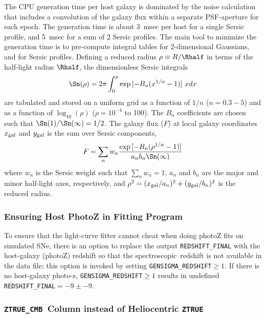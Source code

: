 \documentclass[12pt]{article}
\newcommand{\spec}{spectroscopic}
\newcommand{\ztruecmb}{{\tt ZTRUE\_CMB}}
\newcommand{\ztrue}{{\tt ZTRUE}}
\begin{document}
{The CPU generation time per host galaxy is dominated by the 
noise calculation that includes a convolution of the galaxy 
flux within a separate PSF-aperture for each epoch.  
The generation time is about 3~msec per host for a 
single Sersic profile, and 5~msec for a sum of 2 Sersic profiles.
The main tool to minimize the generation  time is to pre-compute
integral tables for 2-dimensional Gaussians,
and for Sersic profiles. 
Defining a reduced radius $\rho \equiv R/\Rhalf$ in terms
of the half-light radius $\Rhalf$,
the dimensionless Sersic integrals
%
\begin{equation}
  \Sn(\rho) = 2\pi\int_0^\rho  \exp{[-B_n (x^{1/n} -1)]}~ x dx 
\end{equation}
%
are tabulated and stored on a uniform grid as a function of
$1/n$ ($n=0.3 - 5$) and as a function of $\log_{10}(\rho)$
($\rho=10^{-4}$ to 100).  The $B_n$ coefficients are chosen
such that $\Sn(1)/\Sn(\infty) = 1/2$.
The galaxy flux ($F$) at local galaxy coordinates
$x_{\rm gal}$ and $y_{\rm gal}$
is the sum over Sersic components,
\begin{equation}
   F = \sum_n w_n \frac{ \exp{ [-B_n (\rho^{1/n}-1)] } }{a_n b_n\Sn(\infty)} 
\end{equation}
where $w_n$ is the Sersic weight such that $\sum_n w_n=1$,
$a_n$ and $b_n$ are the major and minor half-light axes, 
respectively, and 
$\rho^2 = (x_{\rm gal}/a_n)^2 + (y_{\rm gal}/b_n)^2$
is the reduced radius.



\subsubsection{Ensuring Host PhotoZ in Fitting Program}
\label{sss:hostlib_photoz}

To ensure that the light-curve fitter cannot cheat when doing
photoZ fits on simulated SNe, there is an option to replace the 
output {\tt REDSHIFT\_FINAL} with the host-galaxy (photoZ) redshift
so that the \spec\ redshift is not available in the data file;
this option is invoked by setting {\tt GENSIGMA\_REDSHIFT}$\ge 1$.
If there is no host-galaxy photo-z, {\tt GENSIGMA\_REDSHIFT}$\ge 1$
results in undefined {\tt REDSHIFT\_FINAL}$= -9 \pm -9$.


\label{sss:ZTRUE_CMB}
\subsubsection{\ztruecmb\ Column instead of Heliocentric {\ztrue} }

}
\end{document}
